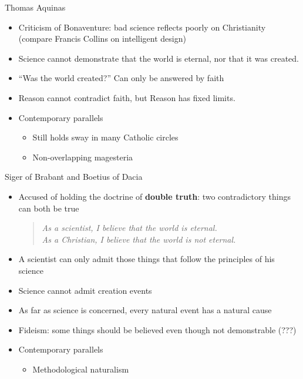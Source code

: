 \documentclass{beamer}
\begin{document}
\begin{frame}{Thomas Aquinas}

\begin{itemize}
\item Criticism of Bonaventure: bad science reflects poorly on
  Christianity (compare Francis Collins on intelligent design)
\item Science cannot demonstrate that the world is eternal, nor that
  it was created.  
\item ``Was the world created?'' Can only be answered by faith
\item Reason cannot contradict faith, but Reason has fixed
  limits. %
\item Contemporary parallels
\begin{itemize}
\item Still holds sway in many Catholic circles
\item Non-overlapping magesteria 
\end{itemize}
\end{itemize}


\end{frame}
\begin{frame}{Siger of Brabant and Boetius of Dacia}

\begin{itemize}
\item Accused of holding the doctrine of \textbf{double truth}: two
  contradictory things can both be true
  \begin{quote} \emph{As a scientist, I believe that the world is
      eternal.  \\ As a Christian, I believe that the world is not
      eternal.} \end{quote}
\item A scientist can only admit those things that follow the
  principles of his science
\item Science cannot admit creation events
\item As far as science is concerned, every natural event has a
  natural cause
\item Fideism: some things should be believed even though not
  demonstrable (???)
\item Contemporary parallels
\begin{itemize}
\item Methodological naturalism
\end{itemize}
\end{itemize}

\end{frame}
\end{document}
